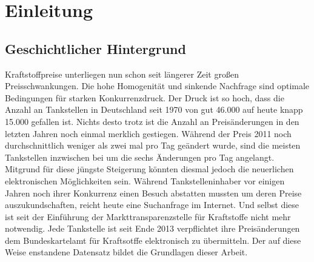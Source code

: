 \documentclass[12pt,a4paper,bibliography=totocnumbered,listof=totocnumbered]{scrartcl}
\begin{document}
\section{Einleitung}

\subsection{Geschichtlicher Hintergrund}
Kraftstoffpreise unterliegen nun schon seit längerer Zeit großen Preisschwankungen. Die hohe Homogenität und sinkende Nachfrage sind optimale Bedingungen für starken Konkurrenzdruck. Der Druck ist so hoch, dass die Anzahl an Tankstellen in Deutschland seit 1970 von gut 46.000 auf heute knapp 15.000 gefallen ist.\cite{PraTa} Nichts desto trotz ist die Anzahl an Preisänderungen in den letzten Jahren noch einmal merklich gestiegen. Während der Preis 2011 noch durchschnittlich weniger als zwei mal pro Tag geändert wurde, sind die meisten Tankstellen inzwischen bei um die sechs Änderungen pro Tag angelangt.\cite{Unity} \\


Mitgrund für diese jüngste Steigerung könnten diesmal jedoch die neuerlichen elektronischen Möglichkeiten sein. Während Tankstelleninhaber vor einigen Jahren noch ihrer Konkurrenz einen Besuch abstatten mussten um deren Preise auszukundschaften, reicht heute eine Suchanfrage im Internet. Und selbst diese ist seit der Einführung der Markttransparenzstelle für Kraftstoffe nicht mehr notwendig. Jede Tankstelle ist seit Ende 2013 verpflichtet ihre Preisänderungen dem Bundeskartelamt für Kraftsotffe elektronisch zu übermitteln. Der auf diese Weise enstandene Datensatz  bildet die Grundlagen dieser Arbeit.\\

\end{document}
